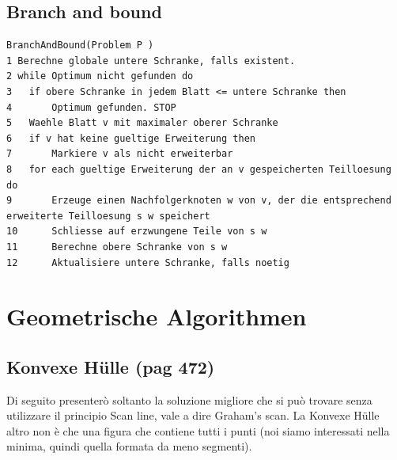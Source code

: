 \documentclass[a4paper]{book}
\newcommand{\lstIndent}{4}
\begin{document}
\section{Branch and bound}
\begin{lstlisting}[tabsize=\lstIndent]
BranchAndBound(Problem P )
1 Berechne globale untere Schranke, falls existent.
2 while Optimum nicht gefunden do
3 	if obere Schranke in jedem Blatt <= untere Schranke then
4		Optimum gefunden. STOP
5	Waehle Blatt v mit maximaler oberer Schranke
6	if v hat keine gueltige Erweiterung then
7		Markiere v als nicht erweiterbar
8	for each gueltige Erweiterung der an v gespeicherten Teilloesung do
9		Erzeuge einen Nachfolgerknoten w von v, der die entsprechend erweiterte Teilloesung s w speichert
10 		Schliesse auf erzwungene Teile von s w
11		Berechne obere Schranke von s w
12		Aktualisiere untere Schranke, falls noetig
\end{lstlisting}

\chapter{Geometrische Algorithmen}
\section{Konvexe Hülle (pag 472)}
Di seguito presenterò soltanto la soluzione migliore che si può trovare senza utilizzare il principio Scan line, vale a dire Graham's scan. La Konvexe Hülle altro non è che una figura che contiene tutti i punti (noi siamo interessati nella minima, quindi quella formata da meno segmenti).
\end{document}
